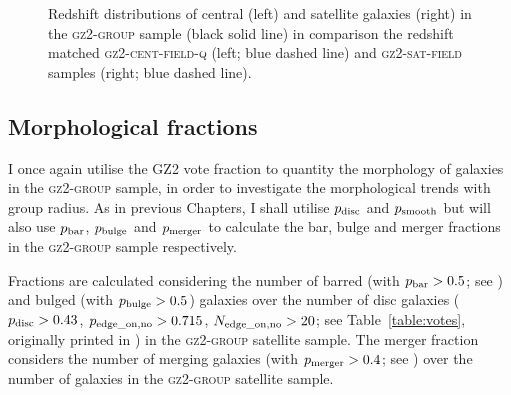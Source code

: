 \begin{figure}
\caption{Redshift distributions of central (left) and satellite galaxies (right) in the \textsc{gz2-group} sample (black solid line) in comparison the redshift matched \textsc{gz2-cent-field-q} (left; blue dashed line) and \textsc{gz2-sat-field} samples (right; blue dashed line).}
\label{fig:zcompare}
\end{figure}

\subsection{Morphological fractions}\label{sec:morphfrac}

I once again utilise the GZ2 vote fraction to quantity the morphology of galaxies in the \textsc{gz2-group} sample, in order to investigate the morphological trends with group radius. As in previous Chapters, I shall utilise $p_{\rm{disc}}$ and $p_{\rm{smooth}}$ but will also use $p_{\rm{bar}}$, $p_{\rm{bulge}}$ and $p_{\rm{merger}}$ to calculate the bar, bulge and merger fractions in the \textsc{gz2-group} sample respectively. 

Fractions are calculated considering the number of barred (with $p_{\rm{bar}} > 0.5$; see \citealt{masters11a, Cheung13}) and bulged (with $p_{\rm{bulge}} > 0.5$) galaxies over the number of disc galaxies ($p_{\rm{disc}} > 0.43$, $p_{\rm{edge\_on, no}} > 0.715$, $N_{\rm{edge\_on, no}} > 20$; see Table~\ref{table:votes}, originally printed in \citealt{GZ2}) in the \textsc{gz2-group} satellite sample. The merger fraction considers the number of merging galaxies (with $p_{\rm{merger}} > 0.4$; see \citealt{Darg10a}) over the number of galaxies in the \textsc{gz2-group} satellite sample. 

